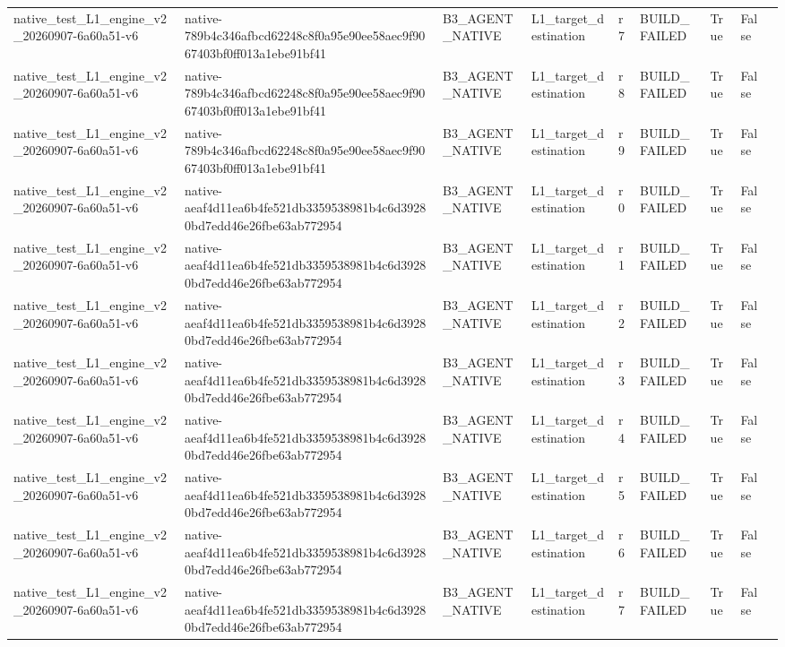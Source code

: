 \begin{tabular}{lllllllll}
native\_test\_L1\_engine\_v2\_20260907-6a60a51-v6 & native-789b4c346afbcd62248c8f0a95e90ee58aec9f9067403bf0ff013a1ebe91bf41 & B3\_AGENT\_NATIVE & L1\_target\_destination & r7 & BUILD\_FAILED & True & False &  \\
native\_test\_L1\_engine\_v2\_20260907-6a60a51-v6 & native-789b4c346afbcd62248c8f0a95e90ee58aec9f9067403bf0ff013a1ebe91bf41 & B3\_AGENT\_NATIVE & L1\_target\_destination & r8 & BUILD\_FAILED & True & False &  \\
native\_test\_L1\_engine\_v2\_20260907-6a60a51-v6 & native-789b4c346afbcd62248c8f0a95e90ee58aec9f9067403bf0ff013a1ebe91bf41 & B3\_AGENT\_NATIVE & L1\_target\_destination & r9 & BUILD\_FAILED & True & False &  \\
native\_test\_L1\_engine\_v2\_20260907-6a60a51-v6 & native-aeaf4d11ea6b4fe521db3359538981b4c6d39280bd7edd46e26fbe63ab772954 & B3\_AGENT\_NATIVE & L1\_target\_destination & r0 & BUILD\_FAILED & True & False &  \\
native\_test\_L1\_engine\_v2\_20260907-6a60a51-v6 & native-aeaf4d11ea6b4fe521db3359538981b4c6d39280bd7edd46e26fbe63ab772954 & B3\_AGENT\_NATIVE & L1\_target\_destination & r1 & BUILD\_FAILED & True & False &  \\
native\_test\_L1\_engine\_v2\_20260907-6a60a51-v6 & native-aeaf4d11ea6b4fe521db3359538981b4c6d39280bd7edd46e26fbe63ab772954 & B3\_AGENT\_NATIVE & L1\_target\_destination & r2 & BUILD\_FAILED & True & False &  \\
native\_test\_L1\_engine\_v2\_20260907-6a60a51-v6 & native-aeaf4d11ea6b4fe521db3359538981b4c6d39280bd7edd46e26fbe63ab772954 & B3\_AGENT\_NATIVE & L1\_target\_destination & r3 & BUILD\_FAILED & True & False &  \\
native\_test\_L1\_engine\_v2\_20260907-6a60a51-v6 & native-aeaf4d11ea6b4fe521db3359538981b4c6d39280bd7edd46e26fbe63ab772954 & B3\_AGENT\_NATIVE & L1\_target\_destination & r4 & BUILD\_FAILED & True & False &  \\
native\_test\_L1\_engine\_v2\_20260907-6a60a51-v6 & native-aeaf4d11ea6b4fe521db3359538981b4c6d39280bd7edd46e26fbe63ab772954 & B3\_AGENT\_NATIVE & L1\_target\_destination & r5 & BUILD\_FAILED & True & False &  \\
native\_test\_L1\_engine\_v2\_20260907-6a60a51-v6 & native-aeaf4d11ea6b4fe521db3359538981b4c6d39280bd7edd46e26fbe63ab772954 & B3\_AGENT\_NATIVE & L1\_target\_destination & r6 & BUILD\_FAILED & True & False &  \\
native\_test\_L1\_engine\_v2\_20260907-6a60a51-v6 & native-aeaf4d11ea6b4fe521db3359538981b4c6d39280bd7edd46e26fbe63ab772954 & B3\_AGENT\_NATIVE & L1\_target\_destination & r7 & BUILD\_FAILED & True & False &  \\

\end{tabular}
